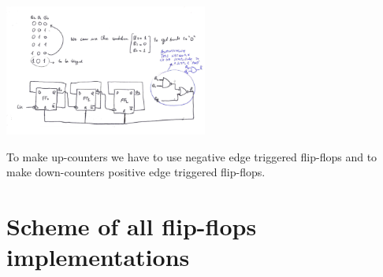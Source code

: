\centering
\includegraphics[width=0.5\textwidth]{C10_24.png}\\
\raggedright

To make up-counters we have to use negative edge triggered flip-flops and to make down-counters positive edge triggered flip-flops.\\




























\section{Scheme of all flip-flops implementations}


